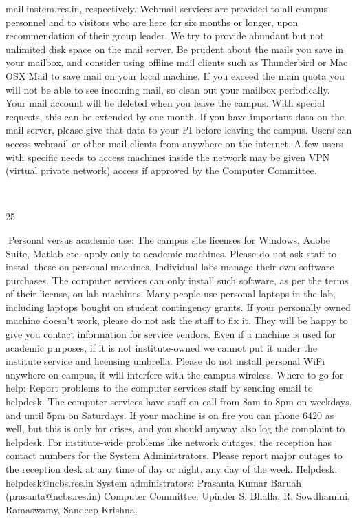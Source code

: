 \documentclass[a4paper,10pt]{article}
\begin{document}
mail.instem.res.in, respectively. Webmail services are provided to all campus personnel
and to visitors who are here for six months or longer, upon recommendation of their group
leader. We try to provide abundant but not unlimited disk space on the mail server. Be
prudent about the mails you save in your mailbox, and consider using offline mail clients
such as Thunderbird or Mac OSX Mail to save mail on your local machine. If you exceed
the main quota you will not be able to see incoming mail, so clean out your mailbox
periodically. Your mail account will be deleted when you leave the campus. With special
requests, this can be extended by one month. If you have important data on the mail server,
please give that data to your PI before leaving the campus. Users can access webmail or
other mail clients from anywhere on the internet. A few users with specific needs to access
machines inside the network may be given VPN (virtual private network) access if approved
by the Computer Committee.

	
  

25	
  

Personal versus academic use: The campus site licenses for Windows, Adobe Suite,
Matlab etc. apply only to academic machines. Please do not ask staff to install these on
personal machines. Individual labs manage their own software purchases. The computer
services can only install such software, as per the terms of their license, on lab machines.
Many people use personal laptops in the lab, including laptops bought on student
contingency grants. If your personally owned machine doesn’t work, please do not ask the
staff to fix it. They will be happy to give you contact information for service vendors. Even
if a machine is used for academic purposes, if it is not institute-owned we cannot put it
under the institute service and licensing umbrella. Please do not install personal WiFi
anywhere on campus, it will interfere with the campus wireless.
Where to go for help: Report problems to the computer services staff by sending email to
helpdesk. The computer services have staff on call from 8am to 8pm on weekdays, and until
5pm on Saturdays. If your machine is on fire you can phone 6420 as well, but this is only for
crises, and you should anyway also log the complaint to helpdesk. For institute-wide
problems like network outages, the reception has contact numbers for the System
Administrators. Please report major outages to the reception desk at any time of day or
night, any day of the week.
Helpdesk: helpdesk@ncbs.res.in
System administrators: Prasanta Kumar Baruah (prasanta@ncbs.res.in)
Computer Committee: Upinder S. Bhalla, R. Sowdhamini, Ramaswamy, Sandeep Krishna.
\end{document}
